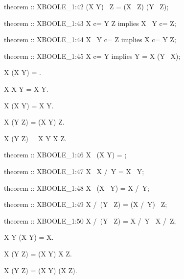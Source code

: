 \begin{paracol}{2}
\begin{mizar}
theorem :: XBOOLE_1:42
  (X \/ Y) \ Z = (X \ Z) \/ (Y \ Z);

theorem :: XBOOLE_1:43
  X c= Y \/ Z implies X \ Y c= Z;

theorem :: XBOOLE_1:44
  X \ Y c= Z implies X c= Y \/ Z;

theorem :: XBOOLE_1:45
  X c= Y implies Y = X \/ (Y \ X);
\end{mizar}

\switchcolumn*\ensurevspace{5cm}

\begin{theorem}
  X \setminus (X \cup Y) = \emptyset.
\end{theorem}

\begin{theorem}
  X \setminus X \cap Y = X \setminus Y.
\end{theorem}

\begin{theorem}
  X \setminus (X \setminus Y) = X \cap Y.
\end{theorem}

\begin{theorem}
  X \cap (Y \setminus Z) = (X \cap Y) \setminus Z.
\end{theorem}

\begin{theorem}
  X \cap (Y \setminus Z) = X \cap Y \setminus X \cap Z.
\end{theorem}

\switchcolumn

\begin{mizar}
theorem :: XBOOLE_1:46
  X \ (X \/ Y) = {};

theorem :: XBOOLE_1:47
  X \ X /\ Y = X \ Y;

theorem :: XBOOLE_1:48
  X \ (X \ Y) = X /\ Y;

theorem :: XBOOLE_1:49
  X /\ (Y \ Z) = (X /\ Y) \ Z;

theorem :: XBOOLE_1:50
  X /\ (Y \ Z) = X /\ Y \ X /\ Z;
\end{mizar}

\switchcolumn*\ensurevspace{5cm}

\begin{theorem}
  X \cap Y \cup (X \setminus Y) = X.
\end{theorem}

\begin{theorem}
  X \setminus (Y \setminus Z) = (X \setminus Y) \cup X \cap Z.
\end{theorem}

\begin{theorem}
  X \setminus (Y \cup Z) = (X \setminus Y) \cap (X \setminus Z).
\end{theorem}


\end{paracol}
